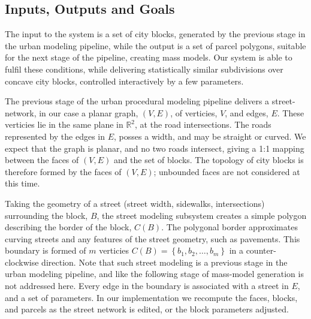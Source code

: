 \subsection{Inputs, Outputs and Goals}
\label{sec:parcelIOandGoals}

The input to the system is a set of city blocks, generated by the previous stage in the urban modeling pipeline, while the output is a set of parcel polygons, suitable for the next stage of the pipeline, creating mass models.
Our system is able to fulfil these conditions, while delivering statistically similar subdivisions over concave city blocks, controlled interactively by a few parameters. 

The previous stage of the urban procedural modeling pipeline delivers a street-network, in our case a planar graph, $(V,E)$, of verticies, $V$, and edges, $E$. These verticies lie in the same plane in $\mathbb{R}^2$, at the road intersections. The roads represented by the edges in $E$, posses a width, and may be straight or curved. We expect that the graph is planar, and no two roads intersect, giving a 1:1 mapping between the faces of $(V,E)$ and the set of blocks. The topology of city blocks is therefore formed by the faces of $(V,E)$; unbounded faces are not considered at this time. 

Taking the geometry of a street (street width, sidewalks, intersections) surrounding the block, $B$, the street modeling subsystem creates a simple polygon describing the border of the block, $C(B)$. The polygonal border approximates curving streets and any features of the street geometry, such as pavements. This boundary is formed of $m$ verticies $C(B)= \left\{ b_1,b_2, \ldots ,b_m \right\}$ in a counter-clockwise direction. Note that such street modeling is a previous stage in the urban modeling pipeline, and like the following stage of mass-model generation is not addressed here. Every edge in the boundary is associated with a street in $E$, and a set of parameters. In our implementation we recompute the faces, blocks, and parcels as the street network is edited, or the block parameters adjusted. 

